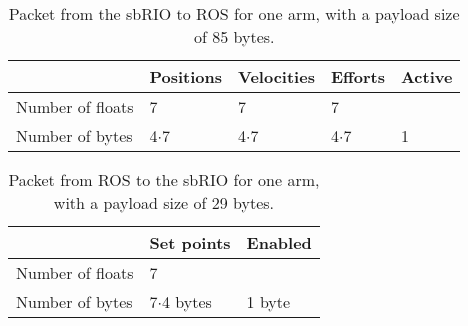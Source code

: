 \begin{table}[H]
\centering
\begin{tabular}{| l | l | l | l | l |}
  \hline			
  				 & Positions & Velocities & Efforts & Active\\ \hline
Number of floats & 7 		 & 7 		  & 7 		& 		\\ \hline
Number of bytes  & 4$\cdot$7 		 & 4$\cdot$7 		  & 4$\cdot$7 	& 1		\\
\hline  
\end{tabular}
\caption{Packet from the sbRIO to ROS for one arm, with a payload size of 85 bytes.}
\label{fig:received_packet}
\end{table}

\begin{table}[H]
\centering
\begin{tabular}{| l | l | l |}
\hline			
					& Set points	 & Enabled\\ \hline
Number of floats	& 7				 &		  \\ \hline
Number of bytes		& 7$\cdot$4 bytes		 & 1 byte \\
\hline  
\end{tabular}
\caption{Packet from ROS to the sbRIO for one arm, with a payload size of 29 bytes.}
\label{fig:sent_packet}
\end{table}








